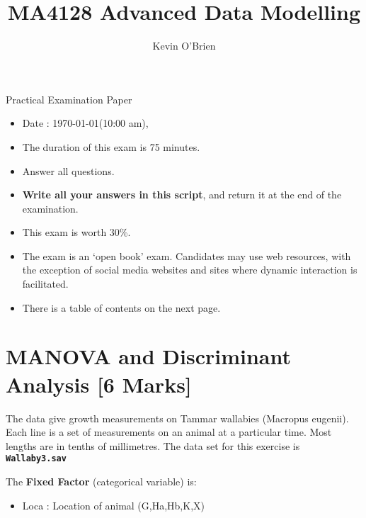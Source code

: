 \documentclass[12pt, a4paper]{article}
\author{ }
\theoremstyle{plain}
\theoremstyle{definition}
\theoremstyle{remark}
\begin{document}
\author{Kevin O'Brien}
\title{MA4128 Advanced Data Modelling}
\maketitle


{\Large
Practical Examination Paper 
}
\begin{itemize}
\item Date : \today     (10:00 am),
\item The duration of this exam is 75 minutes.
\item Answer all questions.
\item \textbf{Write all your answers in this script}, and return it at the end of the examination.
\item This exam is worth 30\%.
\item The exam is an `open book' exam. Candidates may use web resources, with the exception of social media websites and sites where dynamic interaction is facilitated.
\item There is a table of contents on the next page.
\end{itemize}
\newpage
\tableofcontents
\newpage


\section{MANOVA and Discriminant Analysis [6 Marks]}  %
The data give growth measurements on Tammar wallabies (Macropus eugenii). Each line is a set
of measurements on an animal at a particular time. Most lengths are in tenths of millimetres. The data set for this exercise is \textbf{\texttt{Wallaby3.sav}}

\noindent The \textbf{Fixed Factor} (categorical variable) is:
\begin{itemize}
\item 	Loca : Location of animal (G,Ha,Hb,K,X)
\end{itemize}
\bigskip
\end{document}
